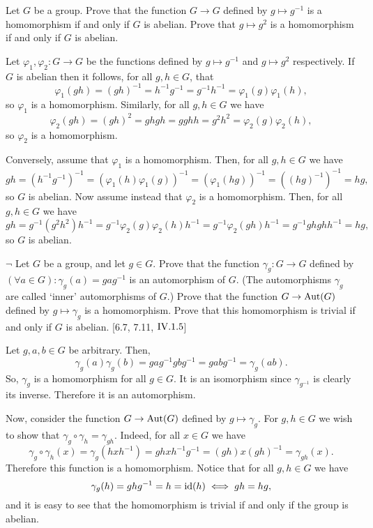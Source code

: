\begin{exercise}
	Let $G$ be a group. Prove that the function $G\to G$ defined by $g\mapsto g^{-1}$ is a homomorphism if and only if $G$ is abelian. Prove that $g\mapsto g^2$ is a homomorphism if and only if $G$ is abelian.
\end{exercise}
\begin{solution}
	Let $\varphi_1 ,\varphi_2 \colon G \to G$ be the functions defined by $g\mapsto g^{-1}$ and $g\mapsto g^2$ respectively. If $G$ is abelian then it follows, for all $g,h\in G$, that
	\[
		\varphi_1(gh) = (gh)^{-1} = h^{-1}g^{-1} = g^{-1}h^{-1} = \varphi_1(g)\varphi_1(h),
	\]
	so $\varphi_1$ is a homomorphism. Similarly, for all $g,h\in G$ we have
	\[
		\varphi_2(gh) = (gh)^2 = ghgh = gghh = g^2h^2 = \varphi_2(g)\varphi_2(h),
	\]
	so $\varphi_2$ is a homomorphism.
	
	Conversely, assume that $\varphi_1$ is a homomorphism. Then, for all $g,h \in G$  we have
	\[gh = (h^{-1}g^{-1})^{-1} = (\varphi_1(h)\varphi_1(g))^{-1} = (\varphi_1(hg))^{-1} = ((hg)^{-1})^{-1}  = hg,\]
	so $G$ is abelian. Now assume instead that $\varphi_2$ is a homomorphism. Then, for all $g,h \in G$ we have
	\[
		gh = g^{-1}(g^2h^2)h^{-1} = g^{-1}\varphi_2(g)\varphi_2(h)h^{-1} = g^{-1}\varphi_2(gh)h^{-1} = g^{-1}ghghh^{-1} = hg,
	\]
	so $G$ is abelian.
\end{solution}

\begin{exercise}
	$\neg$ Let $G$ be a group, and let $g\in G$. Prove that the function $\gamma_g\colon G \to G$ defined by $(\forall a\in G): \gamma_g(a)=gag^{-1}$ is an automorphism of $G$. (The automorphisms $\gamma_g$ are called `inner' automorphisms of $G$.) Prove that the function $G \to \operatorname{Aut}(G)$ defined by $g\mapsto \gamma_g$ is a homomorphism. Prove that this homomorphism is trivial if and only if $G$ is abelian. [6.7, 7.11, $\RNo{4}.1.5$]
\end{exercise}
\begin{solution}
	Let $g,a,b\in G$ be arbitrary. Then, 
	\[\gamma_g(a)\gamma_g(b) = gag^{-1}gbg^{-1} = gabg^{-1} = \gamma_g(ab).\]
	So, $\gamma_g$ is a homomorphism for all $g\in G$. It is an isomorphism since $\gamma_{g^{-1}}$ is clearly its inverse. Therefore it is an automorphism.
	
	Now, consider the function $G\to \operatorname{Aut}(G)$ defined by $g\mapsto \gamma_g$. For $g,h\in G$ we wish to show that $\gamma_g\circ \gamma_h = \gamma_{gh}$. Indeed, for all $x\in G$ we have 
	\[
		\gamma_g\circ\gamma_h(x) = \gamma_g (hxh^{-1}) = ghxh^{-1}g^{-1} = (gh)x(gh)^{-1} = \gamma_{gh}(x).
	\]
	Therefore this function is a homomorphism. Notice that for all $g,h\in G$ we have
	\[
		\gamma_g(h)   = ghg^{-1}   = h = \operatorname{id}(h) \iff gh= hg,
	\]
	and it is easy to see that the homomorphism is trivial if and only if the group is abelian.
\end{solution}

